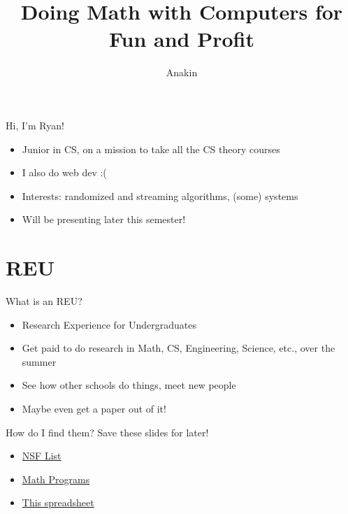 \documentclass[aspectratio=169]{beamer}
\title{Doing Math with Computers for Fun and Profit}
\subtitle{\cite{classifying}}
\author{Anakin}
\date{}
\begin{document}

\begin{frame}
\titlepage
\end{frame}

\begin{frame}{Hi, I'm Ryan!}
    \begin{itemize}
        \item Junior in CS, on a mission to take all the CS theory courses \pause
        \item I also do web dev :( \pause
        \item Interests: randomized and streaming algorithms, (some) systems \pause
        \item Will be presenting later this semester!
    \end{itemize}
\end{frame}

\section{REU}
\frame{\sectionpage}

\begin{frame}{What is an REU?}
    \begin{itemize}
        \item Research Experience for Undergraduates \pause
        \item Get paid to do research in Math, CS, Engineering, Science, etc., over the summer \pause
        \item See how other schools do things, meet new people \pause
        \item Maybe even get a paper out of it!
    \end{itemize}
\end{frame}

\begin{frame}{How do I find them?}
    Save these slides for later!
    \begin{itemize}
        \item \href{https://www.nsf.gov/crssprgm/reu/reu_search.jsp}{NSF List}
        \item \href{https://www.mathprograms.org/db?joblist-0-0----p--}{Math Programs}
        \item \href{https://docs.google.com/spreadsheets/d/1U-27BeHMSJCWumbNByal2tHyYo9wRVud9WoRE70E47Y/edit\#gid=1262276228}{This spreadsheet}
    \end{itemize}
\end{frame}
\end{document}
